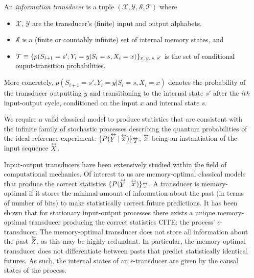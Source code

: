 \begin{definition}[CITE]
An \emph{information transducer} is a tuple $(\mathcal{X},\mathcal{Y},\mathcal{S},\mathcal{T})$ where
\begin{itemize}
    \item $\mathcal{X}$, $\mathcal{Y}$ are the transducer's (finite) input and output alphabets,
    \item $\mathcal{S}$ is a (finite or countably infinite) set of internal memory states, and
    \item $\mathcal{T}\equiv\{p(S_{i+1}=s', Y_i=y\vert S_i = s, X_i=x)\}_{x,\thinspace y,\thinspace s,\thinspace s'}$ is the set of conditional ouput-transition probabilities.
\end{itemize}
More concretely, $p(S_{i+1}=s', Y_i=y\vert S_i = s, X_i=x)$ denotes the probability of the transducer outputting $y$ and transitioning to the internal state $s'$ after the $ith$ input-output cycle, conditioned on the input $x$ and internal state $s$.
\end{definition}

We require a valid classical model to produce statistics that are consistent with the infinite family of stochastic processes describing the quantum probabilities of the ideal reference experiment: $\{P(\oset{\leftrightarrow}{Y}|\oset{\leftrightarrow}{x})\}_{\oset{\leftrightarrow}{x}}$\thinspace, $\oset{\leftrightarrow}{x}$ being an instantiation of the input sequence $\oset{\leftrightarrow}{X}$.

Input-output transducers have been extensively studied within the field of computational mechanics. Of interest to us are memory-optimal classical models that produce the correct statistics $\{P(\oset{\leftrightarrow}{Y}|\oset{\leftrightarrow}{x})\}_{\oset{\leftrightarrow}{x}}$\thinspace. A transducer is memory-optimal if it stores the minimal amount of information about the past (in terms of number of bits) to make statistically correct future predictions. It has been shown that for stationary input-output processes there exists a unique memory-optimal transducer producing the correct statistics CITE: the process' $\epsilon$-transducer. The memory-optimal transducer does not store all information about the past $\oset{\leftarrow}{Z}$, as this may be highly redundant. In particular, the memory-optimal transducer does not differentiate between pasts that predict statistically identical futures. As such, the internal states of an $\epsilon$-transducer are given by the causal states of the process. 

